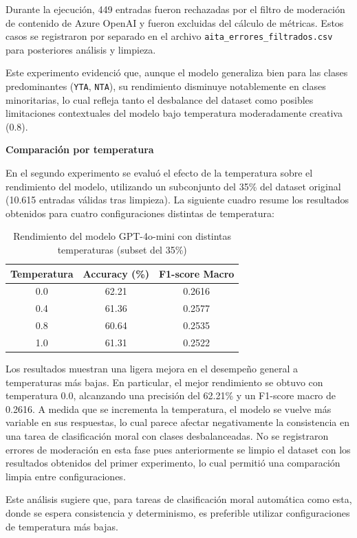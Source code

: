 Durante la ejecución, 449 entradas fueron rechazadas por el filtro de moderación de contenido de Azure OpenAI y fueron excluidas del cálculo de métricas. Estos casos se registraron por separado en el archivo \texttt{aita\_errores\_filtrados.csv} para posteriores análisis y limpieza.

Este experimento evidenció que, aunque el modelo generaliza bien para las clases predominantes (\texttt{YTA}, \texttt{NTA}), su rendimiento disminuye notablemente en clases minoritarias, lo cual refleja tanto el desbalance del dataset como posibles limitaciones contextuales del modelo bajo temperatura moderadamente creativa (0.8).

\textbf{Comparación por temperatura}

En el segundo experimento se evaluó el efecto de la temperatura sobre el rendimiento del modelo, utilizando un subconjunto del 35\% del dataset original (10.615 entradas válidas tras limpieza). La siguiente cuadro resume los resultados obtenidos para cuatro configuraciones distintas de temperatura:

\begin{table}[h]
\centering
\caption{Rendimiento del modelo GPT-4o-mini con distintas temperaturas (subset del 35\%)}
\begin{tabular}{|c|c|c|}
\hline
\textbf{Temperatura} & \textbf{Accuracy (\%)} & \textbf{F1-score Macro} \\
\hline
0.0 & 62.21 & 0.2616 \\
0.4 & 61.36 & 0.2577 \\
0.8 & 60.64 & 0.2535 \\
1.0 & 61.31 & 0.2522 \\
\hline
\end{tabular}
\label{tab:temperatura}
\end{table}

Los resultados muestran una ligera mejora en el desempeño general a temperaturas más bajas. En particular, el mejor rendimiento se obtuvo con temperatura 0.0, alcanzando una precisión del 62.21\% y un F1-score macro de 0.2616. A medida que se incrementa la temperatura, el modelo se vuelve más variable en sus respuestas, lo cual parece afectar negativamente la consistencia en una tarea de clasificación moral con clases desbalanceadas. No se registraron errores de moderación en esta fase pues anteriormente se limpio el dataset con los resultados obtenidos del primer experimento, lo cual permitió una comparación limpia entre configuraciones.

Este análisis sugiere que, para tareas de clasificación moral automática como esta, donde se espera consistencia y determinismo, es preferible utilizar configuraciones de temperatura más bajas.

